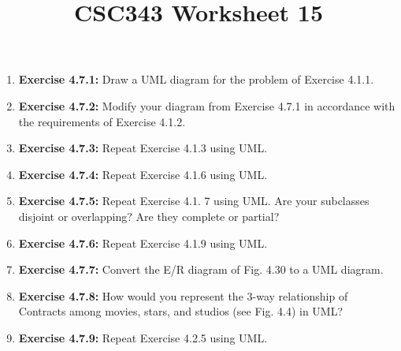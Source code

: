 \documentclass[12pt]{article}
\begin{document}
\title{CSC343 Worksheet 15}
\maketitle

\begin{enumerate}[1.]
    \item \textbf{Exercise 4.7.1:} Draw a UML diagram for the problem of Exercise 4.1.1.
    \item \textbf{Exercise 4.7.2:} Modify your diagram from Exercise 4.7.1 in accordance with the requirements of Exercise 4.1.2.
    \item \textbf{Exercise 4.7.3:} Repeat Exercise 4.1.3 using UML.
    \item \textbf{Exercise 4.7.4:} Repeat Exercise 4.1.6 using UML.
    \item \textbf{Exercise 4.7.5:} Repeat Exercise 4.1. 7 using UML. Are your subclasses disjoint or overlapping? Are they complete or partial?
    \item \textbf{Exercise 4.7.6:} Repeat Exercise 4.1.9 using UML.
    \item \textbf{Exercise 4.7.7:} Convert the E/R diagram of Fig. 4.30 to a UML diagram.
    \item \textbf{Exercise 4.7.8:} How would you represent the 3-way relationship of Contracts among movies, stars, and studios (see Fig. 4.4) in UML?
    \item \textbf{Exercise 4.7.9:} Repeat Exercise 4.2.5 using UML.
\end{enumerate}
\end{document}
